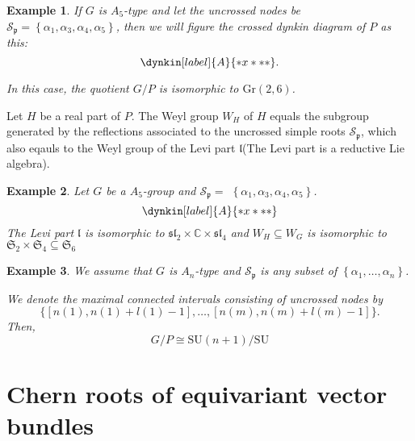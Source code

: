 \documentclass[uplatex,dvipdfmx]{jsarticle}
\newtheorem{example}{Example}[section]
\begin{document}
\begin{example}
    If
    $G$
    is
    $A_5$-type
    and let the uncrossed nodes be
    $\mathcal{S}_{\mathfrak{p}} = \left\{ \alpha_1, \alpha_3, \alpha_4, \alpha_5 \right\}$,
    then we will figure the crossed dynkin diagram of
    $P$
    as this:
    \begin{equation}
        \dynkin[label]{A}{*x***}.
    \end{equation}

    In this case, the quotient
    $G/P$
    is isomorphic to
    $\mathrm{Gr}\left( 2, 6 \right)$.
\end{example}

Let
$H$
be a real part of
$P$.
The Weyl group 
$W_H$
of
$H$
equals the subgroup generated by the reflections associated to the uncrossed simple roots
$\mathcal{S}_\mathfrak{p}$,
which also eqauls to the Weyl group of the Levi part
$\mathfrak{l}$(The Levi part is a reductive Lie algebra).

\begin{example}
    Let 
    $G$ 
    be a 
    $A_5$-group
    and 
    $\mathcal{S}_{\mathfrak{p}} =$    
    $\left\{ \alpha_1, \alpha_3, \alpha_4, \alpha_5 \right\}$.
    \begin{equation*}
        \dynkin[label]{A}{*x***}
    \end{equation*}
    The Levi part
    $\mathfrak{l}$
    is isomorphic to
    $\mathfrak{sl}_2 \times \mathbb{C} \times \mathfrak{sl}_4$
    and
    $W_H \subseteq W_G$
    is isomorphic to
    $\mathfrak{S}_2 \times \mathfrak{S}_4 \subseteq \mathfrak{S}_6$
\end{example}


\begin{example}
    We assume that
    $G$
    is
    $A_n$-type
    and
    $\mathcal{S}_\mathfrak{p}$
    is any subset of 
    $\left\{\alpha_1, \ldots, \alpha_n \right\}$.

    We denote the maximal connected intervals consisting of uncrossed nodes by
    \begin{equation}
        \{[n(1), n(1) + l(1) - 1], \ldots, [n(m), n(m) + l(m) - 1]\}.
    \end{equation}
    Then,
    \begin{equation}
        G/P \cong \mathrm{SU}(n+1)/\mathrm{SU}
    \end{equation}
\end{example}

\section{Chern roots of equivariant vector bundles}
\end{document}
